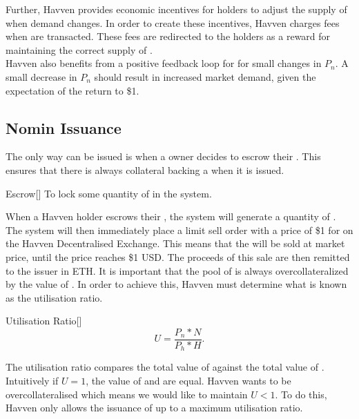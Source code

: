 \noindent Further, Havven provides economic incentives for \HAV{} holders to adjust the supply of \NOM{} when demand changes. In order to create these incentives, Havven charges fees when \NOM{} are transacted. These fees are redirected to the \HAV{} holders as a reward for maintaining the correct supply of \NOM{} . \\

\noindent Havven also benefits from a positive feedback loop for for small changes in $P_n$. A small decrease in $P_n$ should result in increased market demand, given the expectation of the return to \$1. 

\newpage

\subsection{Nomin Issuance} The only way \NOM{} can be issued is when a \HAV{} owner decides to escrow their \HAV{}. This ensures that there is always collateral backing a \NOM{} when it is issued. \\

\begin{namedthm}{Escrow}[]
To lock some quantity of \HAV{} in the system.
\end{namedthm}

\noindent When a Havven holder escrows their \HAV{}, the system will generate a quantity of \NOM{}. The system will then immediately place a limit sell order with a price of \$1 for on the Havven Decentralised Exchange. This means that the \NOM{} will be sold at market price, until the price reaches \$1 USD. The proceeds of this sale are then remitted to the issuer in ETH. It is important that the pool of \NOM{} is always overcollateralized by the value of \HAV{}. In order to achieve this, Havven must determine what is known as the utilisation ratio. \\

\begin{namedthm}{Utilisation Ratio}[]
$$ U = \frac{P_n * N}{P_h * H}. $$
\end{namedthm}

\noindent The utilisation ratio compares the total value of \NOM{} against the total value of \HAV{}. Intuitively if $U = 1$, the value of \NOM{} and \HAV{} are equal. Havven wants to be overcollateralised which means we would like to maintain $U <  1$. To do this, Havven only allows the issuance of \NOM{} up to a maximum utilisation ratio. \\

